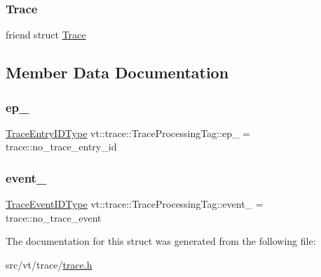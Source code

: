 \subsubsection{\texorpdfstring{Trace}{Trace}}
{\footnotesize\ttfamily friend struct \hyperlink{structvt_1_1trace_1_1_trace}{Trace}\hspace{0.3cm}{\ttfamily [friend]}}



\subsection{Member Data Documentation}
\mbox{\label{structvt_1_1trace_1_1_trace_processing_tag_a60c4d398c815ba8b140f328ce546a918}} 
\subsubsection{\texorpdfstring{ep\+\_\+}{ep\_}}
{\footnotesize\ttfamily \hyperlink{namespacevt_1_1trace_a3c14050715ba9eceaeff51fb3de64f2f}{Trace\+Entry\+I\+D\+Type} vt\+::trace\+::\+Trace\+Processing\+Tag\+::ep\+\_\+ = trace\+::no\+\_\+trace\+\_\+entry\+\_\+id\hspace{0.3cm}{\ttfamily [private]}}

\mbox{\label{structvt_1_1trace_1_1_trace_processing_tag_ac0ed5366eaeca6f02cb4db7bafdaf732}} 
\subsubsection{\texorpdfstring{event\+\_\+}{event\_}}
{\footnotesize\ttfamily \hyperlink{namespacevt_1_1trace_a64a7185f3e102df8d8258f263ccd1582}{Trace\+Event\+I\+D\+Type} vt\+::trace\+::\+Trace\+Processing\+Tag\+::event\+\_\+ = trace\+::no\+\_\+trace\+\_\+event\hspace{0.3cm}{\ttfamily [private]}}



The documentation for this struct was generated from the following file\+:\begin{DoxyCompactItemize}
\item 
src/vt/trace/\hyperlink{trace_2trace_8h}{trace.\+h}\end{DoxyCompactItemize}
